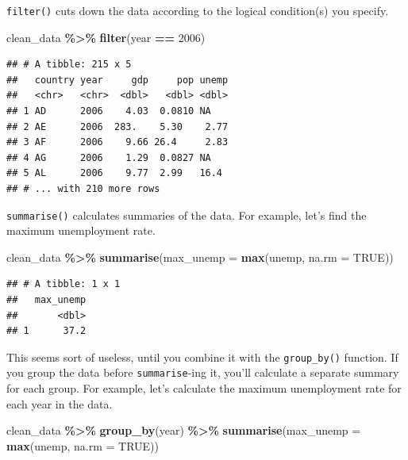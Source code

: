 \documentclass[
  12pt,
  oneside,openany]{book}
\newenvironment{Shaded}{\begin{snugshade}}{\end{snugshade}}
\newcommand{\DataTypeTok}[1]{\textcolor[rgb]{0.13,0.29,0.53}{#1}}
\newcommand{\DecValTok}[1]{\textcolor[rgb]{0.00,0.00,0.81}{#1}}
\newcommand{\KeywordTok}[1]{\textcolor[rgb]{0.13,0.29,0.53}{\textbf{#1}}}
\newcommand{\NormalTok}[1]{#1}
\newcommand{\OperatorTok}[1]{\textcolor[rgb]{0.81,0.36,0.00}{\textbf{#1}}}
\newcommand{\OtherTok}[1]{\textcolor[rgb]{0.56,0.35,0.01}{#1}}
\newcommand{\StringTok}[1]{\textcolor[rgb]{0.31,0.60,0.02}{#1}}
\begin{document}
\texttt{filter()} cuts down the data according to the logical condition(s) you specify.

\begin{Shaded}
\begin{Highlighting}[]
\NormalTok{clean\_data }\OperatorTok{\%\textgreater{}\%}
\StringTok{  }\KeywordTok{filter}\NormalTok{(year }\OperatorTok{==}\StringTok{ }\DecValTok{2006}\NormalTok{)}
\end{Highlighting}
\end{Shaded}

\begin{verbatim}
## # A tibble: 215 x 5
##   country year     gdp     pop unemp
##   <chr>   <chr>  <dbl>   <dbl> <dbl>
## 1 AD      2006    4.03  0.0810 NA   
## 2 AE      2006  283.    5.30    2.77
## 3 AF      2006    9.66 26.4     2.83
## 4 AG      2006    1.29  0.0827 NA   
## 5 AL      2006    9.77  2.99   16.4 
## # ... with 210 more rows
\end{verbatim}

\texttt{summarise()} calculates summaries of the data. For example, let's find the maximum unemployment rate.

\begin{Shaded}
\begin{Highlighting}[]
\NormalTok{clean\_data }\OperatorTok{\%\textgreater{}\%}
\StringTok{  }\KeywordTok{summarise}\NormalTok{(}\DataTypeTok{max\_unemp =} \KeywordTok{max}\NormalTok{(unemp, }\DataTypeTok{na.rm =} \OtherTok{TRUE}\NormalTok{))}
\end{Highlighting}
\end{Shaded}

\begin{verbatim}
## # A tibble: 1 x 1
##   max_unemp
##       <dbl>
## 1      37.2
\end{verbatim}

This seems sort of useless, until you combine it with the \texttt{group\_by()} function. If you group the data before \texttt{summarise}-ing it, you'll calculate a separate summary for each group. For example, let's calculate the maximum unemployment rate for each year in the data.

\begin{Shaded}
\begin{Highlighting}[]
\NormalTok{clean\_data }\OperatorTok{\%\textgreater{}\%}
\StringTok{  }\KeywordTok{group\_by}\NormalTok{(year) }\OperatorTok{\%\textgreater{}\%}
\StringTok{  }\KeywordTok{summarise}\NormalTok{(}\DataTypeTok{max\_unemp =} \KeywordTok{max}\NormalTok{(unemp, }\DataTypeTok{na.rm =} \OtherTok{TRUE}\NormalTok{))}
\end{Highlighting}
\end{Shaded}
\end{document}
